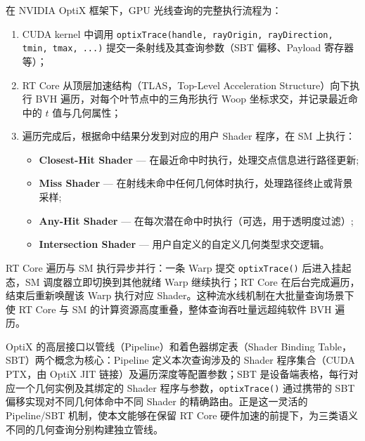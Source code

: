 在 NVIDIA OptiX 框架下，GPU 光线查询的完整执行流程为：
\begin{enumerate}
    \item CUDA kernel 中调用 \texttt{optixTrace(handle, rayOrigin, rayDirection, tmin, tmax, ...)} 提交一条射线及其查询参数（SBT 偏移、Payload 寄存器等）；
    \item RT Core 从顶层加速结构（TLAS，Top-Level Acceleration Structure）向下执行 BVH 遍历，对每个叶节点中的三角形执行 Woop 坐标求交，并记录最近命中的 $t$ 值与几何属性；
    \item 遍历完成后，根据命中结果分发到对应的用户 Shader 程序，在 SM 上执行：
    \begin{itemize}
        \item \textbf{Closest-Hit Shader} --- 在最近命中时执行，处理交点信息进行路径更新;
        \item \textbf{Miss Shader} --- 在射线未命中任何几何体时执行，处理路径终止或背景采样;
        \item \textbf{Any-Hit Shader} --- 在每次潜在命中时执行（可选，用于透明度过滤）;
        \item \textbf{Intersection Shader} --- 用户自定义的自定义几何类型求交逻辑。
    \end{itemize}
\end{enumerate}
RT Core 遍历与 SM 执行异步并行：一条 Warp 提交 \texttt{optixTrace()} 后进入挂起态，SM 调度器立即切换到其他就绪 Warp 继续执行；RT Core 在后台完成遍历，结束后重新唤醒该 Warp 执行对应 Shader。这种流水线机制在大批量查询场景下使 RT Core 与 SM 的计算资源高度重叠，整体查询吞吐量远超纯软件 BVH 遍历。

OptiX 的高层接口以管线（Pipeline）和着色器绑定表（Shader Binding Table，SBT）两个概念为核心：Pipeline 定义本次查询涉及的 Shader 程序集合（CUDA PTX，由 OptiX JIT 链接）及遍历深度等配置参数；SBT 是设备端表格，每行对应一个几何实例及其绑定的 Shader 程序与参数，\texttt{optixTrace()} 通过携带的 SBT 偏移实现对不同几何体命中不同 Shader 的精确路由。正是这一灵活的 Pipeline/SBT 机制，使本文能够在保留 RT Core 硬件加速的前提下，为三类语义不同的几何查询分别构建独立管线。

